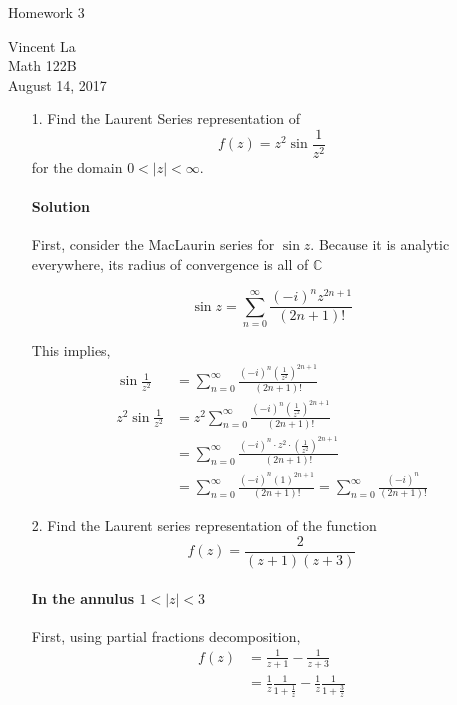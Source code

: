 \documentclass[11pt]{article}
\title{ }
\begin{document}
	\begin{center}	%
		\Large{Homework 3}	%
	\end{center}
	\begin{center}
		Vincent La \\
		Math 122B \\
		August 14, 2017
	\end{center}
	
\begin{enumerate}
	\item[1.] Find the Laurent Series representation of 
	\[f(z) = z^2 \sin{\frac{1}{z^2}}\]
	for the domain $0 < |z| < \infty$.
	
	\paragraph{Solution} First, consider the MacLaurin series for $\sin{z}$. Because it is analytic everywhere, its radius of convergence is all of $\mathbb{C}$ 
	
	\[\sin{z} = \sum^{\infty}_{n=0} \frac{(-i)^n z^{2n+1}}{(2n+1)!} \]
	
	This implies,
	\[\begin{aligned}
	\sin{\frac{1}{z^2}}
	&= \sum^{\infty}_{n=0} \frac{(-i)^n (\frac{1}{z^2})^{2n+1}}{(2n+1)!} \\
	z^2\sin{\frac{1}{z^2}}
	&= z^2 \sum^{\infty}_{n=0} \frac{(-i)^n (\frac{1}{z^2})^{2n+1}}{(2n+1)!} \\
	&= \sum^{\infty}_{n=0} \frac{(-i)^n \cdot z^2 \cdot (\frac{1}{z^2})^{2n+1}}{(2n+1)!} \\
	&= \sum^{\infty}_{n=0} \frac{(-i)^n (1)^{2n+1}}{(2n+1)!}
	= \sum^{\infty}_{n=0} \frac{(-i)^n}{(2n + 1)!}
	\end{aligned}\]
	
	\item[2.] Find the Laurent series representation of the function
	\[f(z) = \frac{2}{(z+1)(z+3)} \]
	
	\paragraph{In the annulus $1 < |z| < 3$}
	First, using partial fractions decomposition,
	\[\begin{aligned}
	f(z) &= \frac{1}{z+1} - \frac{1}{z+3} \\
	&= \frac{1}{z}\frac{1}{1 + \frac{1}{z}} - \frac{1}{z}\frac{1}{1 + \frac{3}{z}} 
	\end{aligned}\]
	

\end{enumerate}
\end{document}
